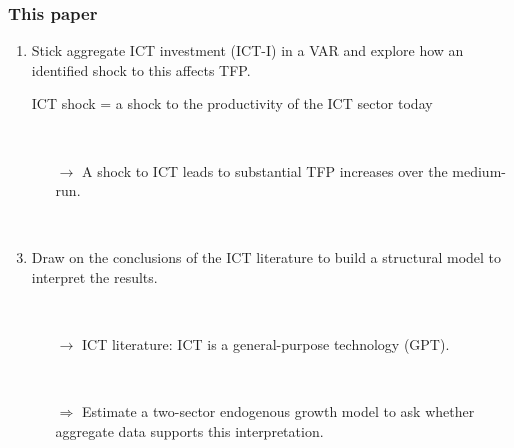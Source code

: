 \documentclass{beamer}
\begin{document}
\begin{frame}
	\frametitle{This paper}
	
	\begin{enumerate}
	\item Stick aggregate ICT investment (ICT-I) in a VAR and explore how an identified shock to this affects TFP.
	\item [] ICT shock = a shock to the productivity of the ICT sector today
	
	\
	
	\begin{itemize}
	\item [$\rightarrow$] A shock to ICT leads to substantial TFP increases over the medium-run.
	\end{itemize}

\
	
    \item Draw on the conclusions of the ICT literature to build a structural model to interpret the results. 
    
    \
    
    	\begin{itemize}
	\item [$\rightarrow$] ICT literature: ICT is a general-purpose technology (GPT).
	
	\
	
	\item[$\Rightarrow$] Estimate a two-sector endogenous growth model to ask whether aggregate data supports this interpretation. 
	\end{itemize}
	
	\end{enumerate} 

\end{frame}
\end{document}
